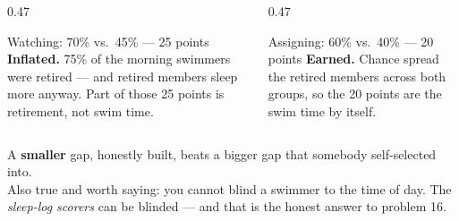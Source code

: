 \documentclass[aspectratio=169, 11pt]{beamer}
\newcommand{\redink}[1]{{\color{redacc}\bfseries #1}}
\begin{document}
\begin{frame}[t, plain]
  \vspace{4pt}
  \begin{columns}[t]
    \begin{column}{0.47\textwidth}
      \begin{block}{Watching: 70\% vs.\ 45\% --- 25 points}
        \redink{Inflated.} 75\% of the morning swimmers were retired --- and retired members
        sleep more anyway. Part of those 25 points is retirement, not swim time.
      \end{block}
    \end{column}
    \begin{column}{0.47\textwidth}
      \begin{block}{Assigning: 60\% vs.\ 40\% --- 20 points}
        \redink{Earned.} Chance spread the retired members across both groups, so the 20
        points are the swim time by itself.
      \end{block}
    \end{column}
  \end{columns}
  \vspace{10pt}
  \begin{center}
    {\large A \redink{smaller} gap, honestly built, beats a bigger gap that somebody
    self-selected into.}\\[5pt]
    {\small\color{slate} Also true and worth saying: you cannot blind a swimmer to the time of
    day. The \emph{sleep-log scorers} can be blinded --- and that is the honest answer to
    problem 16.}
  \end{center}
\end{frame}
\end{document}
